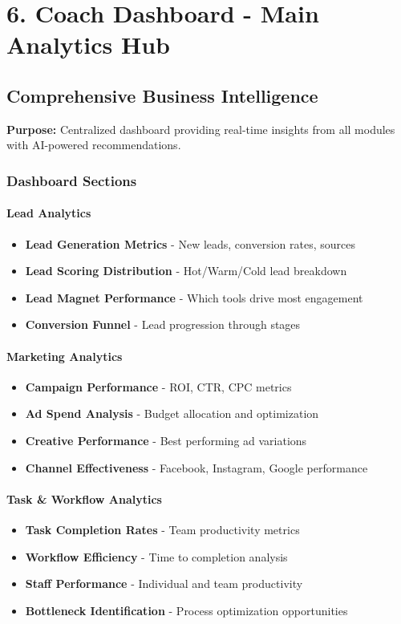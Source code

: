 \documentclass[12pt,a4paper]{article}
\begin{document}
\section{6. Coach Dashboard - Main Analytics Hub}

\subsection{Comprehensive Business Intelligence}
\textbf{Purpose:} Centralized dashboard providing real-time insights from all modules with AI-powered recommendations.

\subsubsection{Dashboard Sections}

\paragraph{Lead Analytics}
\begin{itemize}
    \item \textbf{Lead Generation Metrics} - New leads, conversion rates, sources
    \item \textbf{Lead Scoring Distribution} - Hot/Warm/Cold lead breakdown
    \item \textbf{Lead Magnet Performance} - Which tools drive most engagement
    \item \textbf{Conversion Funnel} - Lead progression through stages
\end{itemize}

\paragraph{Marketing Analytics}
\begin{itemize}
    \item \textbf{Campaign Performance} - ROI, CTR, CPC metrics
    \item \textbf{Ad Spend Analysis} - Budget allocation and optimization
    \item \textbf{Creative Performance} - Best performing ad variations
    \item \textbf{Channel Effectiveness} - Facebook, Instagram, Google performance
\end{itemize}

\paragraph{Task \& Workflow Analytics}
\begin{itemize}
    \item \textbf{Task Completion Rates} - Team productivity metrics
    \item \textbf{Workflow Efficiency} - Time to completion analysis
    \item \textbf{Staff Performance} - Individual and team productivity
    \item \textbf{Bottleneck Identification} - Process optimization opportunities
\end{itemize}
\end{document}

